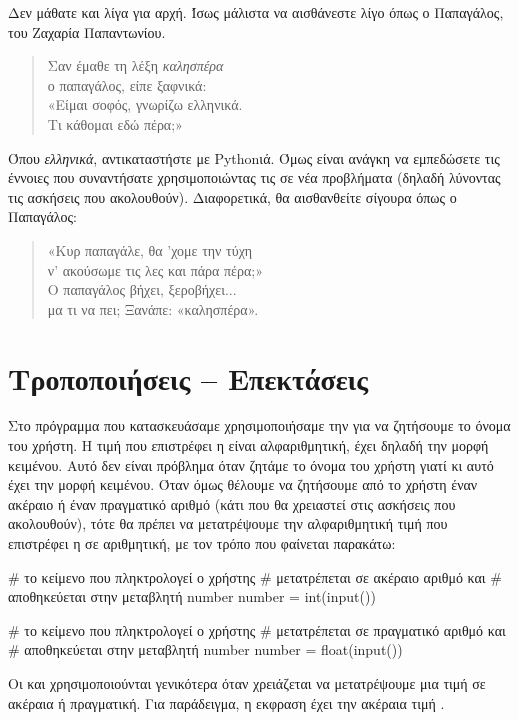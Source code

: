 \documentclass[a4paper,11pt,oneside]{book}
\begin{document}
Δεν μάθατε και λίγα για αρχή. Ίσως μάλιστα να αισθάνεστε λίγο όπως ο Παπαγάλος, του Ζαχαρία Παπαντωνίου.
\begin{quote}
Σαν έμαθε τη λέξη \emph{καλησπέρα}\\
ο παπαγάλος, είπε ξαφνικά:\\
«Είμαι σοφός, γνωρίζω ελληνικά.\\
Τι κάθομαι εδώ πέρα;»
\end{quote}
Όπου \emph{ελληνικά}, αντικαταστήστε με Pythonιά. Όμως είναι ανάγκη να εμπεδώσετε τις έννοιες που συναντήσατε χρησιμοποιώντας τις σε νέα προβλήματα (δηλαδή λύνοντας τις ασκήσεις που ακολουθούν). Διαφορετικά, θα αισθανθείτε σίγουρα όπως ο Παπαγάλος:
\begin{quote}
«Κυρ παπαγάλε, θα ’χομε την τύχη\\
ν’ ακούσωμε τις λες και πάρα πέρα;»\\
Ο παπαγάλος βήχει, ξεροβήχει...\\
μα τι να πει; Ξανάπε: «καλησπέρα».
\end{quote}

\section{Τροποποιήσεις -- Επεκτάσεις}

Στο πρόγραμμα που κατασκευάσαμε χρησιμοποιήσαμε την  για να ζητήσουμε το όνομα του χρήστη. Η τιμή που επιστρέφει η  είναι αλφαριθμητική, έχει δηλαδή την μορφή κειμένου. Αυτό δεν είναι πρόβλημα όταν ζητάμε το όνομα του χρήστη γιατί κι αυτό έχει την μορφή κειμένου. Όταν όμως θέλουμε να ζητήσουμε από το χρήστη έναν ακέραιο ή έναν πραγματικό αριθμό (κάτι που θα χρειαστεί στις ασκήσεις που ακολουθούν), τότε θα πρέπει να μετατρέψουμε την αλφαριθμητική τιμή που επιστρέφει η  σε αριθμητική, με τον τρόπο που φαίνεται παρακάτω:

\begin{pycode}
# το κείμενο που πληκτρολογεί ο χρήστης
# μετατρέπεται σε ακέραιο αριθμό και 
# αποθηκεύεται στην μεταβλητή number
number = int(input())
\end{pycode}

\begin{pycode}
# το κείμενο που πληκτρολογεί ο χρήστης
# μετατρέπεται σε πραγματικό αριθμό και 
# αποθηκεύεται στην μεταβλητή number
number = float(input())
\end{pycode}

Οι  και  χρησιμοποιούνται γενικότερα όταν χρειάζεται να μετατρέψουμε μια τιμή σε ακέραια ή πραγματική. Για παράδειγμα, η εκφραση  έχει την ακέραια τιμή .
\end{document}
